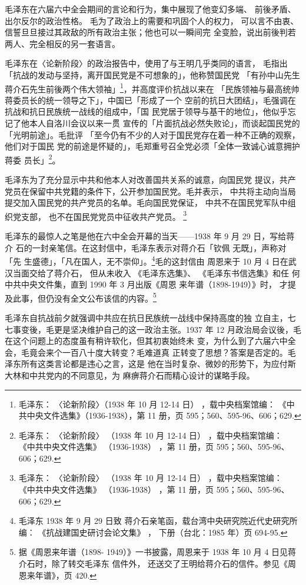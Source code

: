 毛泽东在六届六中全会期间的言论和行为，集中展现了他变幻多端、
前後矛盾、
出尔反尔的政治性格。
毛为了政治上的需要和巩固个人的权力，
可以言不由衷、信誓旦旦接过其政敌的所有政治主张；他也可以一瞬间完
全变脸，说出前後判若两人、完全相反的另一套语言。

毛泽东在〈论新阶段〉的政治报告中，使用了与王明几乎类同的语言，
毛指出「抗战的发动与坚持，离开国民党是不可想象的」，他称赞国民党
「有孙中山先生蒋介石先生前後两个伟大领袖」\footnote{毛泽东：
〈论新阶段〉（1938 年 10 月 12-14 日） ，载中央档案馆编：
《中共中央文件选集》（1936-1938），第 11
册，页 595；560、595-96、606；629.}，并高度评价抗战以来在
「民族领袖与最高统帅蒋委员长的统一领导之下」，中国已「形成了一个
空前的抗日大团结」，毛强调在抗战和抗日民族统一战线的组成中，「国
民党居于领导与基干的地位」，他似乎忘记了他本人自洛川会议以来一贯
宣传的「片面抗战必然失败论」，而谈起国民党的「光明前途」。毛批评
「至今仍有不少的人对于国民党存在着一种不正确的观察，他们对于国民
党的前途是怀疑的」，毛郑重号召全党必须「全体一致诚心诚意拥护蒋委
员长」\footnote{毛泽东：
〈论新阶段〉
（1938 年 10 月 12-14 日）
，载中央档案馆编：
《中共中央文件选集》
（1936-1938）
，第 11
册，页 595；560、595-96、606；629.}。

毛泽东为了充分显示中共和他本人对改善国共关系的诚意，向国民党
提议，共产党员在保留中共党籍的条件下，公开参加国民党。毛并表示，
中共将主动向当局提交加入国民党的共产党员的名单。毛向国民党保证，
中共不在国民党军队中组织党支部，
也不在国民党党员中征收共产党员。
\footnote{毛泽东：
〈论新阶段〉
（1938 年 10 月 12-14 日）
，载中央档案馆编：
《中共中央文件选集》
（1936-1938）
，第 11
册，页 595；560、595-96、606；629.}

毛泽东的最惊人之笔是他在六中全会开幕的当天——1938 年 9 月 29 日，写给蒋介
石的一封亲笔信。在这封信中，毛泽东表示对蒋介石「钦佩 无既」，声称对「先
生盛德」，「凡在国人，无不崇仰」。\footnote{毛泽东 1938 年 9 月 29 日致
蒋介石亲笔函，载台湾中央研究院近代史研究所编： 《抗战建国史研讨会论文集》
， 下册（台北：1985 年）页 694-95.}毛的这封信由 周恩来于 10 月 4 日在武
汉当面交给了蒋介石， 但从未收入 《毛泽东选集》、 《毛泽东书信选集》和任
何中共中央文件集，直到 1990 年 3 月出版《周恩 来年谱（1898-1949）》时，
才提及此事，但仍没有全文公布该信的内容。\footnote{据《周恩来年谱（1898-
1949）》一书披露，周恩来于 1938 年 10 月 4 日见蒋介石时，除了转交毛泽东
信件外， 还送交了王明给蒋介石的信件。参见《周恩来年谱》，页 420.}

毛泽东自抗战前夕就强调中共应在抗日民族统一战线中保持高度的独
立自主，七七事变後，毛更是坚决维护自己的这一政治主张。1937 年 12
月政治局会议後，毛在这个问题上的态度虽有稍许软化，但其初衷始终未
变，为什么到了六届六中全会，毛竟会来个一百八十度大转变？毛难道真
正转变了思想？答案是否定的。毛泽东所有这类言论都是违心之言，这是
他在当时复杂、微妙的形势下，为应付斯大林和中共党内的不同意见，为
麻痹蒋介石而精心设计的谋略手段。

